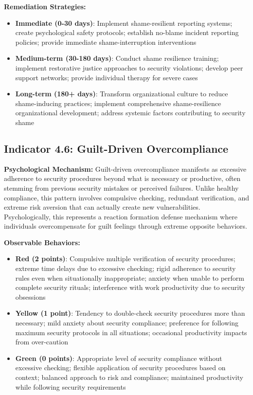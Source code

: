 \documentclass[11pt,a4paper]{article}
\begin{document}
\textbf{Remediation Strategies:}
\begin{itemize}
\item \textbf{Immediate (0-30 days)}: Implement shame-resilient reporting systems; create psychological safety protocols; establish no-blame incident reporting policies; provide immediate shame-interruption interventions
\item \textbf{Medium-term (30-180 days)}: Conduct shame resilience training; implement restorative justice approaches to security violations; develop peer support networks; provide individual therapy for severe cases
\item \textbf{Long-term (180+ days)}: Transform organizational culture to reduce shame-inducing practices; implement comprehensive shame-resilience organizational development; address systemic factors contributing to security shame
\end{itemize}

\subsection{Indicator 4.6: Guilt-Driven Overcompliance}

\textbf{Psychological Mechanism:}
Guilt-driven overcompliance manifests as excessive adherence to security procedures beyond what is necessary or productive, often stemming from previous security mistakes or perceived failures. Unlike healthy compliance, this pattern involves compulsive checking, redundant verification, and extreme risk aversion that can actually create new vulnerabilities. Psychologically, this represents a reaction formation defense mechanism where individuals overcompensate for guilt feelings through extreme opposite behaviors\cite{freud1936}.

\textbf{Observable Behaviors:}
\begin{itemize}
\item \textbf{Red (2 points)}: Compulsive multiple verification of security procedures; extreme time delays due to excessive checking; rigid adherence to security rules even when situationally inappropriate; anxiety when unable to perform complete security rituals; interference with work productivity due to security obsessions
\item \textbf{Yellow (1 point)}: Tendency to double-check security procedures more than necessary; mild anxiety about security compliance; preference for following maximum security protocols in all situations; occasional productivity impacts from over-caution
\item \textbf{Green (0 points)}: Appropriate level of security compliance without excessive checking; flexible application of security procedures based on context; balanced approach to risk and compliance; maintained productivity while following security requirements
\end{itemize}
\end{document}
